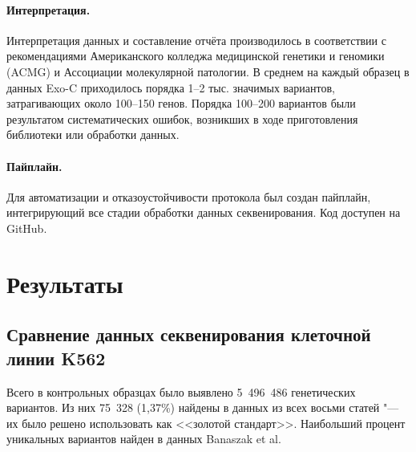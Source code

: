 \documentclass[a4paper,12pt]{article}
\begin{document}
\paragraph{Интерпретация.}
Интерпретация данных и составление отчёта производилось в соответствии с рекомендациями Американского колледжа медицинской генетики и геномики (ACMG) и Ассоциации молекулярной патологии\cite{Richards_2015}.
В среднем на каждый образец в данных Exo-C приходилось порядка 1--2 тыс. значимых вариантов, затрагивающих около 100--150 генов.
Порядка 100--200 вариантов были результатом систематических ошибок, возникших в ходе приготовления библиотеки или обработки данных.

\paragraph{Пайплайн.}
Для автоматизации и отказоустойчивости протокола был создан пайплайн, интегрирующий все стадии обработки данных секвенирования.
Код доступен на GitHub.

\section{Результаты}

\subsection{Сравнение данных секвенирования клеточной линии K562}

Всего в контрольных образцах было выявлено 5~496~486 генетических вариантов.
Из них 75~328 (1,37\%) найдены в данных из всех восьми статей "--- их было решено использовать как <<золотой стандарт>>.
Наибольший процент уникальных вариантов найден в данных Banaszak et al.
\end{document}
